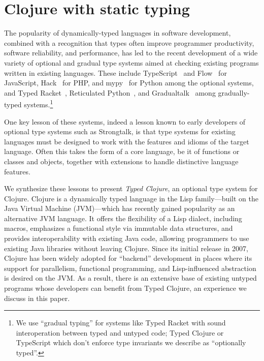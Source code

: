 \section{Clojure with static typing}


The popularity of dynamically-typed languages in software
development, combined with a recognition that types often improve
programmer productivity, software reliability, and performance, has
led to the recent development of a wide variety of optional and
gradual type systems aimed at checking existing programs written in
existing languages.  These include  TypeScript~\cite{typescript} and Flow~\cite{flow} for
JavaScript, Hack~\cite{hack} for PHP, and mypy~\cite{mypy}
for Python among the optional systems, and Typed Racket~\cite{TF08}, Reticulated
Python~\cite{Vitousek14}, and Gradualtalk~\cite{gradualtalk} among gradually-typed systems.\footnote{We
  use ``gradual typing'' for systems like Typed Racket with sound
  interoperation between typed and untyped code; Typed Clojure or
 TypeScript which don't
  enforce type invariants we describe as ``optionally typed''.}

One key lesson of these systems, indeed a lesson known to early
developers of optional type systems such as Strongtalk, is that type
systems for existing languages must be designed to work with the
features and idioms of the target language. Often this takes the form
of a core language, be it of functions or classes and objects,
together with extensions to handle distinctive language features.


We synthesize these lessons to present \emph{Typed Clojure}, an
optional type system for Clojure. 
%
Clojure is a dynamically
typed language in the Lisp family---built on the Java Virtual
Machine (JVM)---which has recently gained popularity as an alternative
JVM language.  It offers the flexibility of a Lisp dialect, including
macros, emphasizes a functional style via
immutable data structures, and provides
interoperability with existing Java code, allowing programmers to use
existing Java libraries without leaving Clojure.
%
Since its initial release in 2007, Clojure has been widely adopted for
``backend'' development in places where its support for parallelism,
functional programming, and Lisp-influenced abstraction is desired on
the JVM. As a result, there is an extensive base of existing untyped
programs whose developers can benefit from Typed Clojure,
an experience we discuss in this paper.

